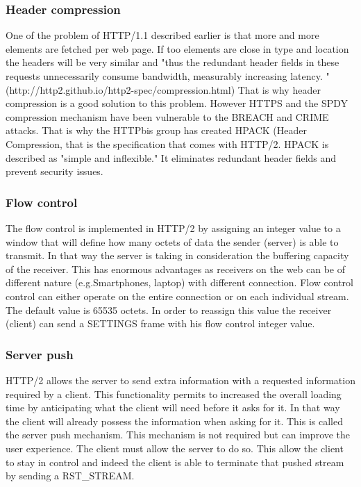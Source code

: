 \subsubsection{Header compression}
One of the problem of HTTP/1.1 described earlier is that more and more elements are fetched per web page. If too elements are close in type and location the headers will be very similar and "thus the redundant header fields in these requests unnecessarily consume bandwidth, measurably increasing latency. " (http://http2.github.io/http2-spec/compression.html) That is why header compression is a good solution to this problem. However HTTPS and the SPDY compression mechanism have been vulnerable to the BREACH and CRIME attacks. That is why the HTTPbis group has created HPACK (Header Compression, that is the specification that comes with HTTP/2. HPACK is described as "simple and inflexible." It eliminates redundant header fields and prevent security issues.
\subsubsection{Flow control}
The flow control is implemented in HTTP/2 by assigning an integer value to a window that will define how many octets of data the sender (server) is able to transmit. In that way the server is taking in consideration the buffering capacity of the receiver. This has enormous advantages as receivers on the web can be of different nature (e.g.Smartphones, laptop) with different connection. Flow control control can either operate on the entire connection or on each individual stream. The default value is 65535 octets. In order to reassign this value the receiver (client) can send a SETTINGS frame with his flow control integer value.
\subsubsection{Server push}
HTTP/2 allows the server to send extra information with a requested information required by a client. This functionality permits to increased the overall loading time by anticipating what the client will need before it asks for it. In that way the client will already possess the information when asking for it. This is called the server push mechanism. This mechanism is not required but can improve the user experience. The client must allow the server to do so. This allow the client to stay in control and indeed the client is able to terminate that pushed stream by sending a RST\_STREAM.

